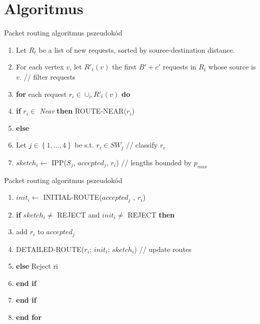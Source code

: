 \documentclass[10pt]{beamer}
\begin{document}
\section{Algoritmus}

\begin{frame}{Packet routing algoritmus pszeudokód}
  \begin{enumerate}
  	\item Let $ R_t $ be a list of new requests, sorted by source-destination distance.
  	\item For each vertex $ v $, let $ R'_t(v) $  the first $ B' + c' $ requests in $ R_t $ whose source is $ v $. // filter requests
  	\item \textbf{for} each request $ r_i \in \cup_v R'_t(v) $ \textbf{do}
  	\item \quad \textbf{if} $ r_i \in $ \textit{Near} \textbf{then} ROUTE-NEAR($ r_i $)
  	\item \quad \textbf{else}
  	\item \quad \quad Let $ j \in \left\lbrace 1,\dots,4 \right\rbrace  $ be s.t. $ r_i \in SW_j $ // classify $ r_i $
  	\item \quad \quad $ sketch_i \leftarrow $ IPP($ S_j $, $ accepted_j $, $ r_i$) // lengths bounded by $ p_{max} $
  	\setcounter{enumTemp}{\theenumi}
  \end{enumerate}
\end{frame}

\begin{frame}{Packet routing algoritmus pszeudokód}
  \begin{enumerate}
  	\setcounter{enumi}{\theenumTemp}
  	\item \quad \quad $ init_i \leftarrow $ INITIAL-ROUTE($ accepted_j $ , $ r_i $)
  	\item \quad \quad \textbf{if} $ sketch_i \neq $ REJECT and $ init_i \neq $ REJECT \textbf{then}
	\item \quad \quad \quad add $ r_i $ to $ accepted_j $
	\item \quad \quad \quad DETAILED-ROUTE($ r_i $; $ init_i $; $ sketch_i $) // update routes
	\item \quad \quad \textbf{else} Reject ri
	\item \quad \quad \textbf{end if}
	\item \quad \textbf{end if}
	\item \textbf{end for}
  \end{enumerate}
\end{frame}
\end{document}
